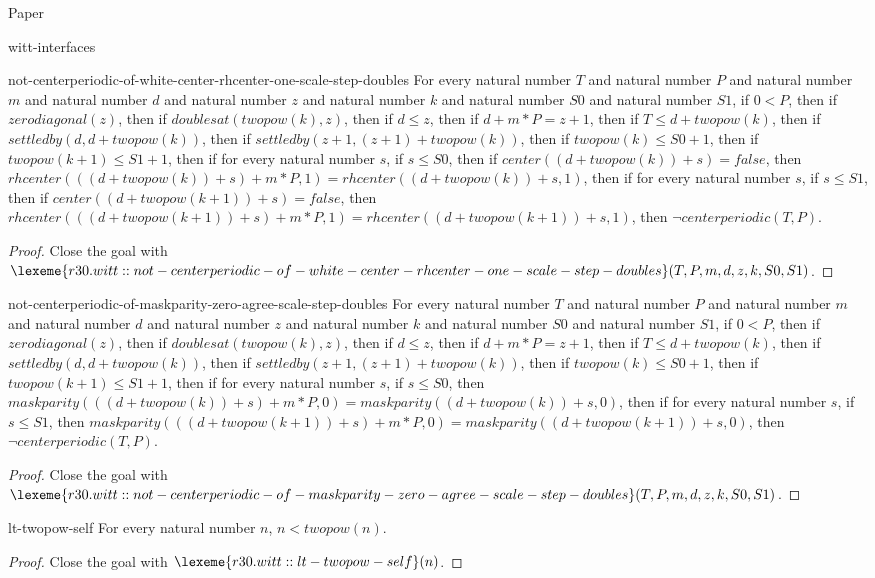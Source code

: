 \begin{lexlean}{Paper}
\begin{section}{witt-interfaces}
  \begin{theorem}{not-centerperiodic-of-white-center-rhcenter-one-scale-step-doubles}
  For every natural number \(T\) and natural number \(P\) and natural number \(m\) and natural number \(d\) and natural number \(z\) and natural number \(k\) and natural number \(S0\) and natural number \(S1\), if \(0 < P\), then if \(zerodiagonal(z)\), then if \(doublesat(twopow(k), z)\), then if \(d ≤ z\), then if \(d + m * P = z + 1\), then if \(T ≤ d + twopow(k)\), then if \(settledby(d, d + twopow(k))\), then if \(settledby(z + 1, (z + 1) + twopow(k))\), then if \(twopow(k) ≤ S0 + 1\), then if \(twopow(k + 1) ≤ S1 + 1\), then if for every natural number \(s\), if \(s ≤ S0\), then if \(center((d + twopow(k)) + s) = false\), then \(rhcenter(((d + twopow(k)) + s) + m * P, 1) = rhcenter((d + twopow(k)) + s, 1)\), then if for every natural number \(s\), if \(s ≤ S1\), then if \(center((d + twopow(k + 1)) + s) = false\), then \(rhcenter(((d + twopow(k + 1)) + s) + m * P, 1) = rhcenter((d + twopow(k + 1)) + s, 1)\), then \(¬ centerperiodic(T, P)\).
  \begin{proof}
  Close the goal with \(\lexeme{r30.witt::not-centerperiodic-of-white-center-rhcenter-one-scale-step-doubles}(T, P, m, d, z, k, S0, S1)\).
  \end{proof}
  \end{theorem}

  \begin{theorem}{not-centerperiodic-of-maskparity-zero-agree-scale-step-doubles}
  For every natural number \(T\) and natural number \(P\) and natural number \(m\) and natural number \(d\) and natural number \(z\) and natural number \(k\) and natural number \(S0\) and natural number \(S1\), if \(0 < P\), then if \(zerodiagonal(z)\), then if \(doublesat(twopow(k), z)\), then if \(d ≤ z\), then if \(d + m * P = z + 1\), then if \(T ≤ d + twopow(k)\), then if \(settledby(d, d + twopow(k))\), then if \(settledby(z + 1, (z + 1) + twopow(k))\), then if \(twopow(k) ≤ S0 + 1\), then if \(twopow(k + 1) ≤ S1 + 1\), then if for every natural number \(s\), if \(s ≤ S0\), then \(maskparity(((d + twopow(k)) + s) + m * P, 0) = maskparity((d + twopow(k)) + s, 0)\), then if for every natural number \(s\), if \(s ≤ S1\), then \(maskparity(((d + twopow(k + 1)) + s) + m * P, 0) = maskparity((d + twopow(k + 1)) + s, 0)\), then \(¬ centerperiodic(T, P)\).
  \begin{proof}
  Close the goal with \(\lexeme{r30.witt::not-centerperiodic-of-maskparity-zero-agree-scale-step-doubles}(T, P, m, d, z, k, S0, S1)\).
  \end{proof}
  \end{theorem}
  \begin{theorem}{lt-twopow-self}
  For every natural number \(n\), \(n < twopow(n)\).
  \begin{proof}
  Close the goal with \(\lexeme{r30.witt::lt-twopow-self}(n)\).
  \end{proof}
  \end{theorem}


\end{section}
\end{lexlean}
